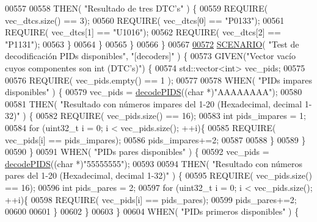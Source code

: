 \begin{DoxyCode}
{00557 
00558             THEN( \textcolor{stringliteral}{"Resultado de tres DTC's"} ) \{
00559                 REQUIRE( vec\_dtcs.size() == 3);
00560                 REQUIRE( vec\_dtcs[0] == \textcolor{stringliteral}{"P0133"});
00561                 REQUIRE( vec\_dtcs[1] == \textcolor{stringliteral}{"U1016"});
00562                 REQUIRE( vec\_dtcs[2] == \textcolor{stringliteral}{"P1131"});
00563             \}
00564         \}
00565     \}
00566 \}
00567 
\hyperlink{UnitTestCase_8cpp_afcf7b592e5ac913ea9c83936bfc18227}{00572} \hyperlink{UnitTestCase_8cpp_aa6afb62ebdd4c3e07996c995f623eb6b}{SCENARIO}( \textcolor{stringliteral}{"Test de decodificación PIDs disponibles"}, \textcolor{stringliteral}{"[decoders]"} ) \{
00573     GIVEN(\textcolor{stringliteral}{"Vector vacío cuyos componentes son int (DTC's)"}) \{
00574         std::vector<int> vec\_pids;
00575 
00576         REQUIRE( vec\_pids.empty() == 1 );
00577 
00578         WHEN( \textcolor{stringliteral}{"PIDs impares disponibles"} ) \{
00579             vec\_pids = \hyperlink{decoders_8cpp_aef44cca306ed9c74b146d2b7dd058763}{decodePIDS}((\textcolor{keywordtype}{char} *)\textcolor{stringliteral}{"AAAAAAAA"});
00580 
00581             THEN( \textcolor{stringliteral}{"Resultado con números impares del 1-20 (Hexadecimal, decimal 1-32)"} ) \{
00582                 REQUIRE( vec\_pids.size() == 16);
00583                 \textcolor{keywordtype}{int} pids\_impares = 1;
00584                 \textcolor{keywordflow}{for} (uint32\_t i = 0; i < vec\_pids.size(); ++i)\{
00585                     REQUIRE( vec\_pids[i] == pids\_impares);
00586                     pids\_impares+=2;
00587 
00588                 \}
00589             \}
00590         \}
00591         WHEN( \textcolor{stringliteral}{"PIDs pares disponibles"} ) \{
00592             vec\_pids = \hyperlink{decoders_8cpp_aef44cca306ed9c74b146d2b7dd058763}{decodePIDS}((\textcolor{keywordtype}{char} *)\textcolor{stringliteral}{"55555555"});
00593 
00594             THEN( \textcolor{stringliteral}{"Resultado con números pares del 1-20 (Hexadecimal, decimal 1-32)"} ) \{
00595                 REQUIRE( vec\_pids.size() == 16);
00596                 \textcolor{keywordtype}{int} pids\_pares = 2;
00597                 \textcolor{keywordflow}{for} (uint32\_t i = 0; i < vec\_pids.size(); ++i)\{
00598                     REQUIRE( vec\_pids[i] == pids\_pares);
00599                     pids\_pares+=2;
00600 
00601                 \}
00602             \}
00603         \}
00604         WHEN( \textcolor{stringliteral}{"PIDs primeros disponibles"} ) \{
}
\end{DoxyCode}
